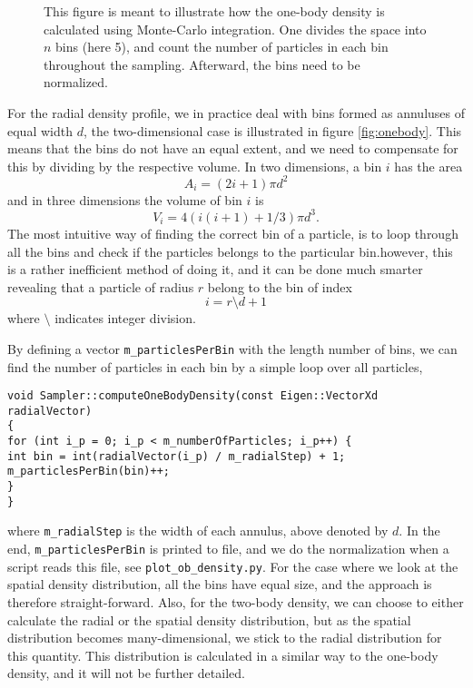 \begin{figure}
	\centering
	
	\caption{This figure is meant to illustrate how the one-body density is calculated using Monte-Carlo integration. One divides the space into $n$ bins (here 5), and count the number of particles in each bin throughout the sampling. Afterward, the bins need to be normalized.}
	\label{fig:onebody}
\end{figure}
For the radial density profile, we in practice deal with bins formed as annuluses of equal width $d$, the two-dimensional case is illustrated in figure \eqref{fig:onebody}. This means that the bins do not have an equal extent, and we need to compensate for this by dividing by the respective volume. In two dimensions, a bin $i$ has the area
\begin{equation}
A_i=(2i+1)\pi d^2
\end{equation}
and in three dimensions the volume of bin $i$ is
\begin{equation}
V_i=4(i(i+1)+1/3)\pi d^3.
\end{equation}
The most intuitive way of finding the correct bin of a particle, is to loop through all the bins and check if the particles belongs to the particular bin.however, this is a rather inefficient method of doing it, and it can be done much smarter revealing that a particle of radius $r$ belong to the bin of index
\begin{equation}
i=r\setminus d + 1
\end{equation}
where $\setminus$ indicates integer division. 

By defining a vector \lstinline|m_particlesPerBin| with the length number of bins, we can find the number of particles in each bin by a simple loop over all particles,
\begin{lstlisting}
void Sampler::computeOneBodyDensity(const Eigen::VectorXd radialVector)
{
for (int i_p = 0; i_p < m_numberOfParticles; i_p++) {
int bin = int(radialVector(i_p) / m_radialStep) + 1;
m_particlesPerBin(bin)++;
}
}
\end{lstlisting}
where \lstinline|m_radialStep| is the width of each annulus, above denoted by $d$. In the end, \lstinline|m_particlesPerBin| is printed to file, and we do the normalization when a script reads this file, see \lstinline|plot_ob_density.py|. For the case where we look at the spatial density distribution, all the bins have equal size, and the approach is therefore straight-forward. Also, for the two-body density, we can choose to either calculate the radial or the spatial density distribution, but as the spatial distribution becomes many-dimensional, we stick to the radial distribution for this quantity. This distribution is calculated in a similar way to the one-body density, and it will not be further detailed. 

